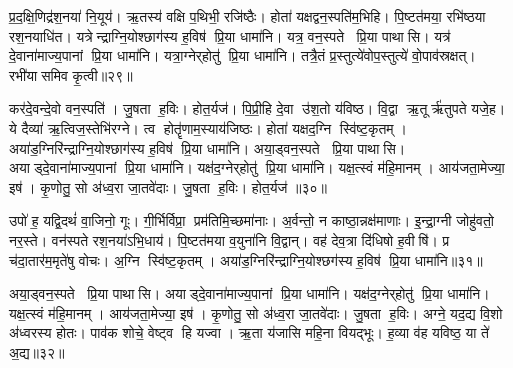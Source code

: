 प्र॒द॒क्षि॒णिद्र॑श॒नया॑ नि॒यूय॑।
ऋ॒तस्य॑ वक्षि प॒थिभी॒ रजि॑ष्ठैः।
होता॑ यक्षद्वन॒स्पति॑म॒भिहि।
पि॒ष्टत॑मया॒ रभि॑ष्ठया रश॒नयाधि॑त।
यत्रेन्द्राग्नि॒योश्छाग॑स्य ह॒विष॑ प्रि॒या धामा॑नि।
यत्र॒ वन॒स्पते प्रि॒या पाथासि।
यत्र॑ दे॒वाना॑माज्य॒पानां प्रि॒या धामा॑नि।
यत्रा॒ग्नेर्‌होतु॑ प्रि॒या धामा॑नि।
तत्रै॒तं प्र॒स्तुत्ये॑वोप॒स्तुत्ये॑ वो॒पाव॑स्रक्षत्।
रभी॑यासमिव कृ॒त्वी॥२९॥

कर॑दे॒वन्दे॒वो वन॒स्पति॑।
जु॒षता ह॒विः।
होत॒र्यज॑।
पि॒प्री॒हि दे॒वा उ॑श॒तो य॑विष्ठ।
वि॒द्वा ऋ॒तूर्\mbox{}ऋ॑तुपते यजे॒ह।
ये दैव्या॑ ऋ॒त्विज॒स्तेभि॑रग्ने।
त्व होतॄ॑णाम॒स्याय॑जिष्ठः।
होता॑ यक्षद॒ग्नि स्वि॑ष्ट॒कृतम्।
अया॑ड॒ग्निरि॑न्द्राग्नि॒योश्छाग॑स्य ह॒विष॑ प्रि॒या धामा॑नि।
अया॒ड्वन॒स्पते प्रि॒या पाथासि।
अयाड्दे॒वाना॑माज्य॒पानां प्रि॒या धामा॑नि।
यक्ष॑द॒ग्नेर्‌होतु॑ प्रि॒या धामा॑नि।
यक्ष॒त्स्वं म॑हि॒मानम्।
आय॑जता॒मेज्या॒ इष॑।
कृ॒णोतु॒ सो अ॑ध्व॒रा जा॒तवे॑दाः।
जु॒षता ह॒विः।
होत॒र्यज॑ ॥३०॥\anuvakamend[नू॒नमर्थं॑ कृ॒त्वी पाथासि स॒प्त च॑]

उपो॑ ह॒ यद्वि॒दथं॑ वा॒जिनो॒ गूः।
गी॒र्भिर्विप्रा॒ प्रम॑तिमि॒च्छमा॑नाः।
अ॒र्वन्तो॒ न काष्ठा॒न्नक्ष॑माणाः।
इ॒न्द्रा॒ग्नी जोहु॑वतो॒ नर॒स्ते।
वन॑स्पते रश॒नया॑ऽभि॒धाय॑।
पि॒ष्टत॑मया व॒युना॑नि वि॒द्वान्।
वह॑ देव॒त्रा दि॑धिषो ह॒वीषि॑।
प्र च॑दा॒तार॑म॒मृते॑षु वोचः।
अ॒ग्नि स्वि॑ष्ट॒कृतम्।
अया॑ड॒ग्निरि॑न्द्राग्नि॒योश्छग॑स्य ह॒विष॑ प्रि॒या धामा॑नि॥३१॥

अया॒ड्वन॒स्पते प्रि॒या पाथासि।
अयाड्दे॒वाना॑माज्य॒पानां प्रि॒या धामा॑नि।
यक्ष॑द॒ग्नेर्‌होतु॑ प्रि॒या धामा॑नि।
यक्ष॒त्स्वं म॑हि॒मानम्।
आय॑जता॒मेज्या॒ इष॑।
कृ॒णोतु॒ सो अ॑ध्व॒रा जा॒तवे॑दाः।
जु॒षता ह॒विः।
अग्ने॒ यद॒द्य वि॒शो अ॑ध्वरस्य होतः।
पाव॑क शोचे॒ वेष्ट्व हि यज्वा।
ऋ॒ता य॑जासि महि॒ना वियद्भूः।
ह॒व्या व॑ह यविष्ठ॒ या ते॑ अ॒द्य॥३२॥\anuvakamend[धामा॑नि॒ भूरेकं च]

